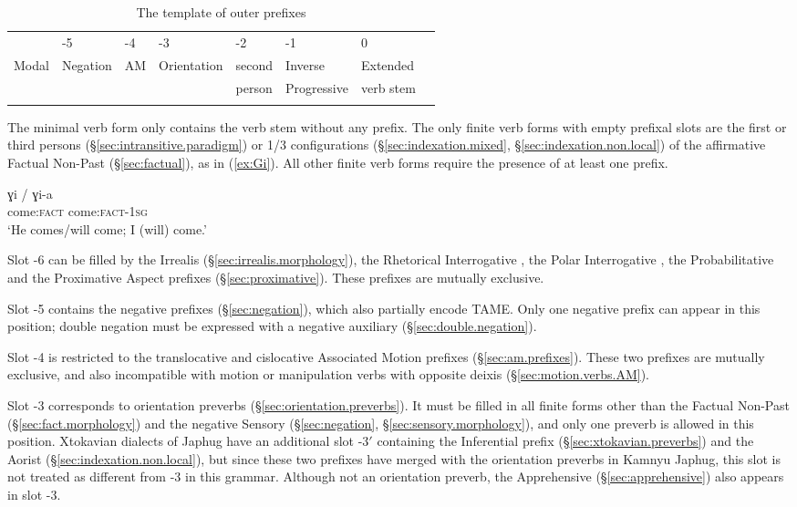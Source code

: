 \begin{table}
\caption{The template of outer prefixes }\label{tab:template.inflectional.pref}
\begin{tabular}{llllllll}
\lsptoprule
-6 & -5 & -4 & -3 & -2 & -1 &   0  &  \\
Modal & Negation & AM & Orientation & second   & Inverse &Extended \\
& & & & person & Progressive &verb stem\\
\lspbottomrule
\end{tabular}
\end{table}

The minimal verb form only contains the verb stem without any prefix. The only finite verb forms with empty prefixal slots are the first or third persons (§\ref{sec:intransitive.paradigm}) or \textsc{1/3}\flobv{} configurations (§\ref{sec:indexation.mixed}, §\ref{sec:indexation.non.local}) of the affirmative Factual Non-Past (§\ref{sec:factual}), as in (\ref{ex:Gi}). All other finite verb forms require the presence of at least one prefix.

\begin{exe}
\ex \label{ex:Gi}
\gll ɣi / ɣi-a \\
come:\textsc{fact} { } come:\textsc{fact}-\textsc{1sg} \\
\glt `He comes/will come; I (will) come.' 
\end{exe}

Slot -6 can be filled by the Irrealis   (§\ref{sec:irrealis.morphology}), the Rhetorical Interrogative , the Polar Interrogative  , the Probabilitative  and the Proximative Aspect   prefixes (§\ref{sec:proximative}). These prefixes are mutually exclusive. 

Slot -5 contains the negative prefixes (§\ref{sec:negation}), which also partially encode TAME. Only one negative prefix can appear in this position; double negation must be expressed with a negative auxiliary (§\ref{sec:double.negation}).

Slot -4 is restricted to the translocative  and cislocative  Associated Motion prefixes (§\ref{sec:am.prefixes}). These two prefixes are mutually exclusive, and also incompatible with motion or manipulation verbs with opposite deixis (§\ref{sec:motion.verbs.AM}).

Slot -3 corresponds to orientation preverbs (§\ref{sec:orientation.preverbs}). It must be filled in all finite forms other than the Factual Non-Past (§\ref{sec:fact.morphology}) and the negative Sensory (§\ref{sec:negation}, §\ref{sec:sensory.morphology}), and only one preverb is allowed in this position. Xtokavian dialects of Japhug have an additional slot -3$'$ containing the Inferential  prefix (§\ref{sec:xtokavian.preverbs}) and the Aorist  (§\ref{sec:indexation.non.local}), but since these two prefixes have merged with the orientation preverbs in Kamnyu Japhug, this slot is not treated as different from -3 in this grammar. Although not an orientation preverb, the Apprehensive  (§\ref{sec:apprehensive}) also appears in slot -3.

